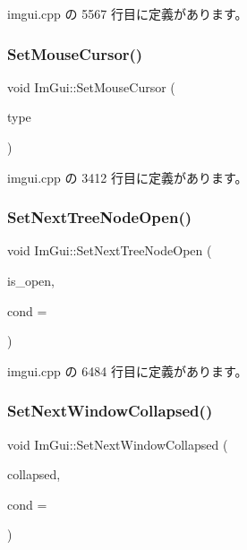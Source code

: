  imgui.\+cpp の 5567 行目に定義があります。

\mbox{\label{namespace_im_gui_ae212a3516efcba50a684df202c8e63ad}} 
\subsubsection{\texorpdfstring{Set\+Mouse\+Cursor()}{SetMouseCursor()}}
{\footnotesize\ttfamily void Im\+Gui\+::\+Set\+Mouse\+Cursor (\begin{DoxyParamCaption}\item[{\mbox{\hyperlink{imgui_8h_a9223d6c82bb5d12c2eab5f829ca520ef}{Im\+Gui\+Mouse\+Cursor}}}]{type }\end{DoxyParamCaption})}



 imgui.\+cpp の 3412 行目に定義があります。

\mbox{\label{namespace_im_gui_ab9a0c20b04a753449494fb20ec2e0e87}} 
\subsubsection{\texorpdfstring{Set\+Next\+Tree\+Node\+Open()}{SetNextTreeNodeOpen()}}
{\footnotesize\ttfamily void Im\+Gui\+::\+Set\+Next\+Tree\+Node\+Open (\begin{DoxyParamCaption}\item[{bool}]{is\+\_\+open,  }\item[{\mbox{\hyperlink{imgui_8h_aef890d6ac872e12c5804d0b3e4f7f103}{Im\+Gui\+Cond}}}]{cond = {} }\end{DoxyParamCaption})}



 imgui.\+cpp の 6484 行目に定義があります。

\mbox{\label{namespace_im_gui_a3e9380e253a3c49665a404e56950a52a}} 
\subsubsection{\texorpdfstring{Set\+Next\+Window\+Collapsed()}{SetNextWindowCollapsed()}}
{\footnotesize\ttfamily void Im\+Gui\+::\+Set\+Next\+Window\+Collapsed (\begin{DoxyParamCaption}\item[{bool}]{collapsed,  }\item[{\mbox{\hyperlink{imgui_8h_aef890d6ac872e12c5804d0b3e4f7f103}{Im\+Gui\+Cond}}}]{cond = {} }\end{DoxyParamCaption})}



